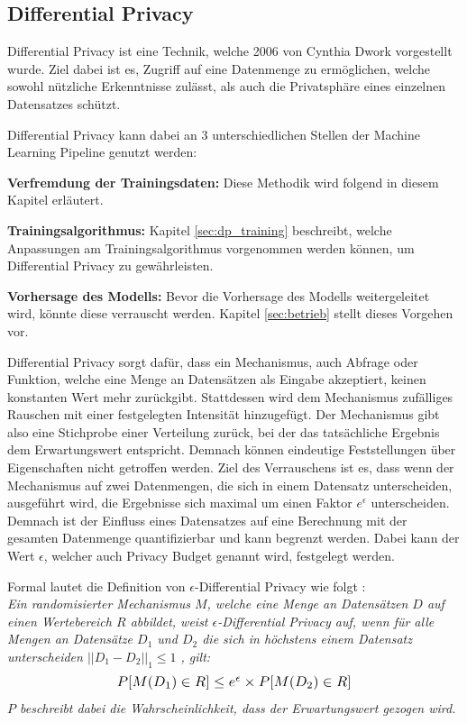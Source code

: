 \subsection{Differential Privacy}\label{sec:dp}

Differential Privacy ist eine Technik, welche 2006 von Cynthia Dwork \cite{P-26} vorgestellt wurde.
Ziel dabei ist es, Zugriff auf eine Datenmenge zu ermöglichen, welche sowohl nützliche Erkenntnisse zulässt, als auch die Privatsphäre eines einzelnen Datensatzes schützt.

Differential Privacy kann dabei an 3 unterschiedlichen Stellen der Machine Learning Pipeline genutzt werden:
\begin{compactitem}
\item \textbf{Verfremdung der Trainingsdaten:} Diese Methodik wird folgend in diesem Kapitel erläutert.
\item \textbf{Trainingsalgorithmus:} Kapitel \ref{sec:dp_training} beschreibt, welche Anpassungen am Trainingsalgorithmus vorgenommen werden können, um Differential Privacy zu gewährleisten.
\item \textbf{Vorhersage des Modells:} Bevor die Vorhersage des Modells weitergeleitet wird, könnte diese verrauscht werden. Kapitel \ref{sec:betrieb} stellt dieses Vorgehen vor.
\end{compactitem}

Differential Privacy \cite{P-26} sorgt dafür, dass ein Mechanismus, auch Abfrage oder Funktion, welche eine Menge an Datensätzen als Eingabe akzeptiert, keinen konstanten Wert mehr zurückgibt.
Stattdessen wird dem Mechanismus zufälliges Rauschen mit einer festgelegten Intensität hinzugefügt.
Der Mechanismus gibt also eine Stichprobe einer Verteilung zurück, bei der das tatsächliche Ergebnis dem Erwartungswert entspricht.
Demnach können eindeutige Feststellungen über Eigenschaften nicht getroffen werden.
Ziel des Verrauschens ist es, dass wenn der Mechanismus auf zwei Datenmengen, die sich in einem Datensatz unterscheiden, ausgeführt wird, die Ergebnisse sich maximal um einen Faktor $e^\epsilon$ unterscheiden. 
Demnach ist der Einfluss eines Datensatzes auf eine Berechnung mit der gesamten Datenmenge quantifizierbar und kann begrenzt werden.
Dabei kann der Wert $\epsilon$, welcher auch Privacy Budget genannt wird, festgelegt werden.

Formal lautet die Definition von $\epsilon$-Differential Privacy wie folgt \cite{P-26}:\\
\textit{
Ein randomisierter Mechanismus $M$, welche eine Menge an Datensätzen $D$ auf einen Wertebereich $R$ abbildet, weist $\epsilon$-Differential Privacy auf, wenn für alle Mengen an Datensätze $D_{1}$ und $D_{2}$ die sich in höchstens einem Datensatz unterscheiden $||D_{1} - D_{2}||_{1} \leq 1$ , gilt:}
\begin{equation}
\resizebox{!}{0.3cm}{$
    P[M(D_{1}) \in R] \leq e^{\epsilon} \times P[M(D_{2}) \in R]
$}
\end{equation}
\textit{$P$ beschreibt dabei die Wahrscheinlichkeit, dass der Erwartungswert gezogen wird.}

